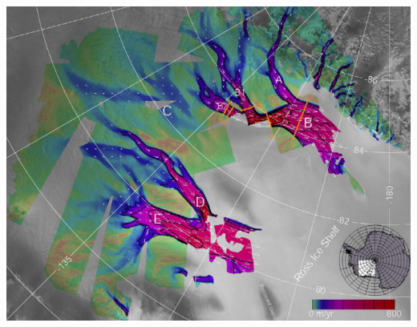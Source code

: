 \documentclass[hide notes,intlimits]{beamer}
\begin{document}
\begin{frame}
\begin{columns}
\begin{column}{0.5\textwidth}
\begin{center}

\includegraphics[height=0.45\textheight]{siple}
\end{center}
\end{column}
\end{columns}
\end{frame}
\end{document}
